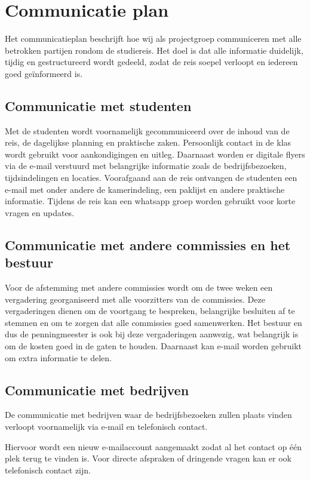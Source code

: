 \section{Communicatie plan}
Het communicatieplan beschrijft hoe wij als projectgroep communiceren met alle betrokken partijen rondom de studiereis. Het doel is dat alle informatie duidelijk, tijdig en gestructureerd wordt gedeeld, zodat de reis soepel verloopt en iedereen goed geïnformeerd is.

\subsection{Communicatie met studenten}
Met de studenten wordt voornamelijk gecommuniceerd over de inhoud van de reis, de dagelijkse planning en praktische zaken. Persoonlijk contact in de klas wordt gebruikt voor aankondigingen en uitleg. Daarnaast worden er digitale flyers via de e-mail verstuurd met belangrijke informatie zoals de bedrijfsbezoeken, tijdsindelingen en locaties. Voorafgaand aan de reis ontvangen de studenten een e-mail met onder andere de kamerindeling, een paklijst en andere praktische informatie. Tijdens de reis kan een whatsapp groep worden gebruikt voor korte vragen en updates.

\subsection{Communicatie met andere commissies en het bestuur}
Voor de afstemming met andere commissies wordt om de twee weken een vergadering georganiseerd met alle voorzitters van de commissies. Deze vergaderingen dienen om de voortgang te bespreken, belangrijke besluiten af te stemmen en om te zorgen dat alle commissies goed samenwerken. Het bestuur en dus de penningmeester is ook bij deze vergaderingen aanwezig, wat belangrijk is om de kosten goed in de gaten te houden. Daarnaast kan e-mail worden gebruikt om extra informatie te delen.

\subsection{Communicatie met bedrijven}
De communicatie met bedrijven waar de bedrijfsbezoeken zullen plaats vinden verloopt voornamelijk via e-mail en telefonisch contact.

\vspace{6.7cm}

 Hiervoor wordt een nieuw e-mailaccount aangemaakt zodat al het contact op één plek terug te vinden is. Voor directe afspraken of dringende vragen kan er ook telefonisch contact zijn.

